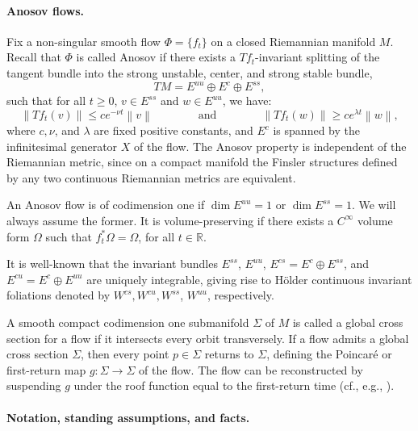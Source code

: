 \documentclass[11pt,letterpaper,reqno,abstract=true]{scrartcl}
\theoremstyle{plain}                              %
\theoremstyle{definition}                         %
\theoremstyle{remark}                             %
\newcommand{\R}{\mathbb{R}}                     %
\providecommand{\norm}[1]{\left\lVert#1\right\rVert}       %
\begin{document}
\paragraph{Anosov flows.} Fix a non-singular smooth flow
$\Phi = \{ f_t \}$ on a closed Riemannian manifold $M$. Recall that
$\Phi$ is called \textsf{Anosov} if there exists a $Tf_t$-invariant
splitting of the tangent bundle into the strong unstable, center, and
strong stable bundle,
%
\begin{displaymath}
%
  TM = E^{uu} \oplus E^c \oplus E^{ss},
%
\end{displaymath}
%
such that for all $t \geq 0$, $v \in E^{ss}$ and $w \in E^{uu}$, we
have:
%
\begin{displaymath}     \tag{$\spadesuit$}
%
\norm{Tf_t (v)} \leq c e^{-\nu t } \norm{v}
\qquad \qquad \text{and} \qquad
\qquad \norm{Tf_t(w)} \geq c e^{\lambda t} \norm{w},
%
\end{displaymath}
%
where $c, \nu$, and $\lambda$ are fixed positive constants, and $E^c$
is spanned by the infinitesimal generator $X$ of the flow. The Anosov
property is independent of the Riemannian metric, since on a compact
manifold the Finsler structures defined by any two continuous
Riemannian metrics are equivalent.

An Anosov flow is of \textsf{codimension one} if $\dim E^{uu} = 1$ or
$\dim E^{ss} = 1$. We will always assume the former. It is
\textsf{volume-preserving} if there exists a $C^\infty$ volume form
$\Omega$ such that $f_t^\ast \Omega = \Omega$, for all $t \in \R$.

It is well-known that the invariant bundles $E^{ss}$, $E^{uu}$,
$E^{cs} = E^c \oplus E^{ss}$, and $E^{cu} = E^c \oplus E^{uu}$ are
uniquely integrable, giving rise to H\"older continuous invariant
foliations \cite{hps77,psw+97} denoted by $W^{cs}, W^{cu}, W^{ss}$,
$W^{uu}$, respectively.

A smooth compact codimension one submanifold $\Sigma$ of $M$ is called
a \textsf{global cross section} for a flow if it intersects every
orbit transversely. If a flow admits a global cross section $\Sigma$,
then every point $p \in \Sigma$ returns to $\Sigma$, defining the
Poincar\'e or first-return map $g: \Sigma \to \Sigma$ of the flow. The
flow can be reconstructed by \textsf{suspending} $g$ under the roof
function equal to the first-return time (cf., e.g., \cite{katok+95}).


\paragraph{Notation, standing assumptions, and facts.}
\end{document}
